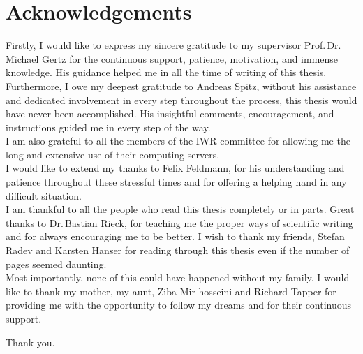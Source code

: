 \thispagestyle{empty}

\chapter*{Acknowledgements}

\noindent
%
Firstly, I would like to express my sincere gratitude to my supervisor Prof.\,Dr.\,Michael Gertz for the continuous support, patience, motivation, and immense knowledge. His guidance helped me in all the time of writing of this thesis.\\
Furthermore, I owe my deepest gratitude to Andreas Spitz, without his assistance and dedicated involvement in every step throughout the process, this thesis would have never been accomplished. His insightful comments, encouragement, and instructions guided me in every step of the way. \\
I am also grateful to all the members of the IWR committee for allowing me the long and extensive use of their computing servers.\\
I would like to extend my thanks to Felix Feldmann, for his understanding and patience throughout these stressful times and for offering a helping hand in any difficult situation.\\
I am thankful to all the people who read this thesis completely or in parts. Great thanks to Dr.\,Bastian Rieck, for teaching me the proper ways of scientific writing and for always encouraging me to be better. I wish to thank my friends, Stefan Radev and Karsten Hanser for reading through this thesis even if the number of pages seemed daunting. \\
Most importantly, none of this could have happened without my family. I would like to thank my mother, my aunt, Ziba Mir-hosseini and Richard Tapper for providing me with the opportunity to follow my dreams and for their continuous support. 
\begin{flushleft}
  Thank you.
\end{flushleft}

